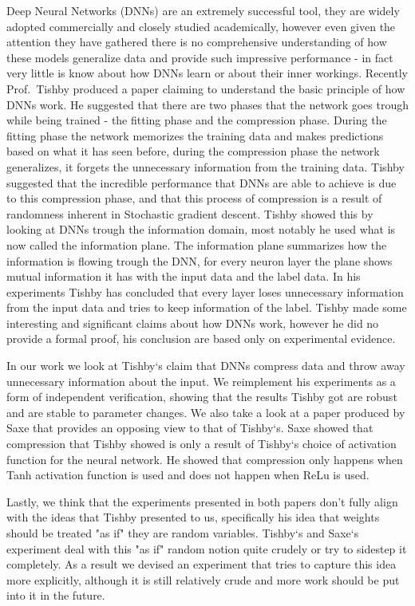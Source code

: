 Deep Neural Networks (DNNs) are an extremely successful tool, they are widely
adopted commercially and closely studied academically, however even given the
attention they have gathered there is no comprehensive understanding of how
these models generalize data and provide such impressive performance - in fact
very little is know about how DNNs learn or about their inner workings. Recently
Prof.\ Tishby produced a paper claiming to understand the basic principle of how
DNNs work. He suggested that there are two phases that the network goes trough
while being trained - the fitting phase and the compression phase. During the
fitting phase the network memorizes the training data and makes predictions
based on what it has seen before, during the compression phase the network
generalizes, it forgets the unnecessary information from the training data.
Tishby suggested that the incredible performance that DNNs are able to achieve
is due to this compression phase, and that this process of compression is a
result of randomness inherent in Stochastic gradient descent. Tishby showed this
by looking at DNNs trough the information domain, most notably he used what is
now called the information plane. The information plane summarizes how the
information is flowing trough the DNN, for every neuron layer the plane shows
mutual information it has with the input data and the label data. In his
experiments Tishby has concluded that every layer loses unnecessary information
from the input data and tries to keep information of the label.
Tishby made some interesting and significant claims about how DNNs work, however
he did no provide a formal proof, his conclusion are based only on experimental
evidence. 

In our work we look at Tishby`s claim that DNNs compress data and throw away
unnecessary information about the input. We reimplement his experiments as a
form of independent verification, showing that the results Tishby got are robust
and are stable to parameter changes. We also take a look at a paper produced by
Saxe that provides an opposing view to that of Tishby`s. Saxe showed that
compression that Tishby showed is only a result of Tishby`s choice of
activation function for the neural network. He showed that compression only
happens when Tanh activation function is used and does not happen when ReLu is
used.

Lastly, we think that the experiments presented in both papers don't fully align
with the ideas that Tishby presented to us, specifically his idea that weights
should be treated "as if" they are random variables. Tishby`s and Saxe`s
experiment deal with this "as if" random notion quite crudely or try to sidestep
it completely. As a result we devised an experiment that tries to capture this
idea more explicitly, although it is still relatively crude and more work should
be put into it in the future.

